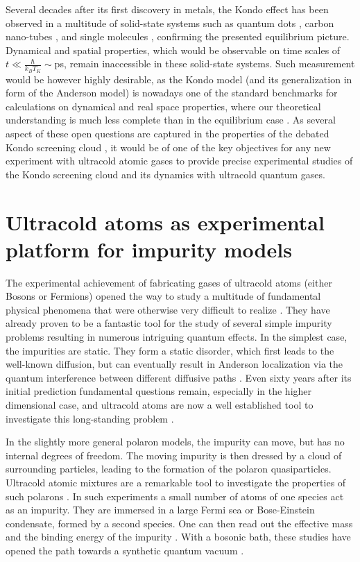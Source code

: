\documentclass[10pt]{article}
\let\cite\citep
\providecommand\citep{\cite}
\begin{document}
Several decades after its first discovery in metals, the Kondo effect has been observed in a multitude
of solid-state systems such as quantum dots \cite{Kastner_1998,Cronenwett_1998,Schmid_1998}, carbon nano-tubes \cite{Nyg_rd_2000}, and single molecules \cite{Liang_2002,Park_2002}, confirming the presented equilibrium picture. Dynamical and spatial properties, which would
be observable on time scales of $t \ll \frac{\hbar}{k_B T_K} \sim $ps, remain inaccessible in these solid-state systems.
Such measurement would be however highly desirable, as the Kondo model (and its generalization in form of the Anderson model) is nowadays one of the standard benchmarks for calculations on dynamical and real space properties, where our theoretical understanding is much less complete than in the equilibrium case \cite{Polkovnikov_2011,Bock_2016}. As several aspect of these open questions are captured in the properties of the debated Kondo screening cloud \cite{Park_2013}, it would be of one of the key objectives for any new experiment with ultracold atomic gases to provide precise experimental studies of the Kondo screening cloud and its dynamics with ultracold quantum gases.

\section{Ultracold atoms as experimental platform for impurity models}

The experimental achievement of fabricating gases of ultracold atoms (either Bosons or Fermions) opened the way to study a multitude of fundamental physical phenomena that were otherwise very difficult to realize \cite{Bloch_2008}. They have already proven to be a fantastic tool for the study of several simple impurity problems resulting in numerous intriguing quantum effects.
In the simplest case, the impurities are static. They form a static disorder, which first leads to the well-known diffusion, but can eventually result in Anderson localization via the quantum interference between different diffusive paths \cite{Anderson_1958}. Even sixty years after its initial prediction fundamental questions remain, especially in the higher dimensional case, and ultracold atoms are now a well established tool to investigate this long-standing problem \cite{Billy_2008,Roati_2008,Jendrzejewski_2012,Semeghini_2015}. 

In the slightly more general polaron models, the impurity can move, but has no internal degrees of freedom. The moving impurity is then dressed by a cloud of surrounding particles, leading to the formation of the polaron quasiparticles. Ultracold atomic mixtures are a remarkable tool to investigate the properties of such polarons \cite{Chevy_2010}. In such experiments a small number of atoms of one species act as an impurity. They are immersed in a large Fermi sea or Bose-Einstein condensate, formed by a second species. One can then read out the effective mass \cite{Nascimb_ne_2009} and the binding energy of the impurity \cite{Schirotzek_2009}. With a bosonic bath, these studies have opened the path towards a synthetic quantum vacuum \cite{Rentrop_2016,J_rgensen_2016,Hu_2016}.
\end{document}

